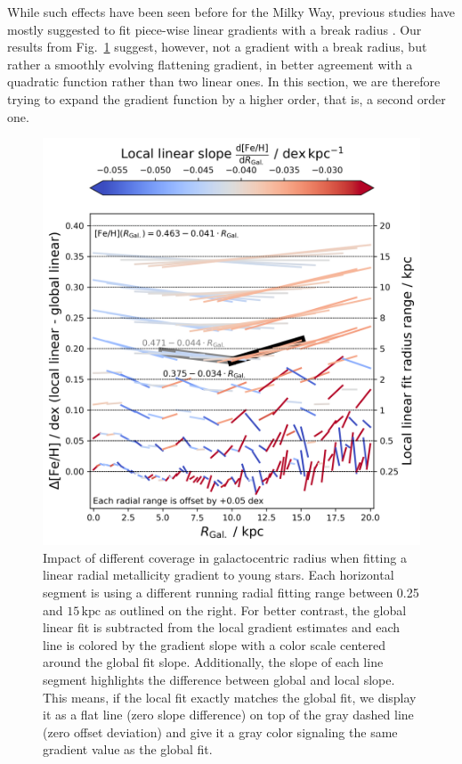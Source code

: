 \documentclass[fleqn,usenatbib]{mnras}
\begin{document}
While such effects have been seen before for the Milky Way, previous studies have mostly suggested to fit piece-wise linear gradients with a break radius \citep[e.g.][]{Andrievsky2002, Yong2012, Boeche2013, Hayden2014, Anders2017, Donor2020}. Our results from Fig.~\ref{fig:radial_range_impact} suggest, however, not a gradient with a break radius, but rather a smoothly evolving flattening gradient, in better agreement with a quadratic function rather than two linear ones. In this section, we are therefore trying to expand the gradient function by a higher order, that is, a second order one.

\begin{figure}
    \centering
    \includegraphics[width=\columnwidth]{figures/radial_range_impact.png}
    \caption{Impact of different coverage in galactocentric radius when fitting a linear radial metallicity gradient to young stars. Each horizontal segment is using a different running radial fitting range between 0.25 and $15\,\mathrm{kpc}$ as outlined on the right. For better contrast, the global linear fit is subtracted from the local gradient estimates and each line is colored by the gradient slope with a color scale centered around the global fit slope. Additionally, the slope of each line segment highlights the difference between global and local slope. This means, if the local fit exactly matches the global fit, we display it as a flat line (zero slope difference) on top of the gray dashed line (zero offset deviation) and give it a gray color signaling the same gradient value as the global fit.}
    \label{fig:radial_range_impact}
\end{figure}
\end{document}
